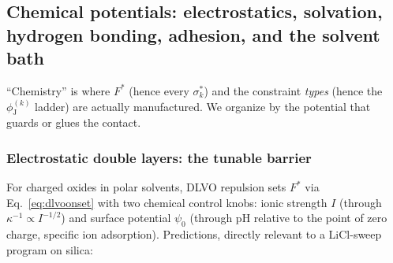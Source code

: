 \documentclass[11pt]{article}
\newcommand{\phiJ}{\phi_{\mathrm{J}}}
\newcommand{\sigmastar}{\sigma^{*}}
\newcommand{\Fstar}{F^{*}}
\begin{document}
\subsection{Chemical potentials: electrostatics, solvation, hydrogen bonding, adhesion, and the solvent bath}
\label{sec:chemistry}

``Chemistry'' is where $\Fstar$ (hence every $\sigmastar_k$) and the constraint \emph{types} (hence the $\phiJ^{(k)}$ ladder) are actually manufactured. We organize by the potential that guards or glues the contact.

\subsubsection{Electrostatic double layers: the tunable barrier}
For charged oxides in polar solvents, DLVO repulsion sets $\Fstar$ via Eq.~\eqref{eq:dlvoonset} with two chemical control knobs: ionic strength $I$ (through $\kappa^{-1} \propto I^{-1/2}$) and surface potential $\psi_0$ (through pH relative to the point of zero charge, specific ion adsorption). Predictions, directly relevant to a LiCl-sweep program on silica:
\end{document}
